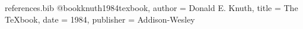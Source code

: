 %
%
%
%
%
%
%
%

\begin{filecontents*}[overwrite]{references.bib}
@book{knuth1984texbook,
  author    = {Donald E. Knuth},
  title     = {The TeXbook},
  date      = {1984},
  publisher = {Addison-Wesley}
}
\end{filecontents*}

\documentclass[11pt,twoside]{impeart}





\setmonofont{Latin Modern Mono}

